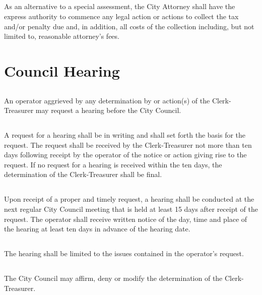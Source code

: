 \subsection{}
As an alternative to a special assessment, the City Attorney shall have the express authority to commence any legal action or actions to collect the tax and/or penalty due and, in addition, all costs of the collection including, but not limited to, reasonable attorney’s fees.

\section{Council Hearing}
\subsection{}
An operator aggrieved by any determination by or action(s) of the Clerk-Treasurer may request a hearing before the City Council.
\subsection{}
A request for a hearing shall be in writing and shall set forth the basis for the request.  The request shall be received by the Clerk-Treasurer not more than ten days following receipt by the operator of the notice or action giving rise to the request.  If no request for a hearing is received within the ten days, the determination of the Clerk-Treasurer shall be final.
\subsection{}
Upon receipt of a proper and timely request, a hearing shall be conducted at the next regular City Council meeting that is held at least 15 days after receipt of the request.  The operator shall receive written notice of the day, time and place of the hearing at least ten days in advance of the hearing date.
\subsection{}
The hearing shall be limited to the issues contained in the operator’s request.
\subsection{}
The City Council may affirm, deny or modify the determination of the Clerk-Treasurer.

